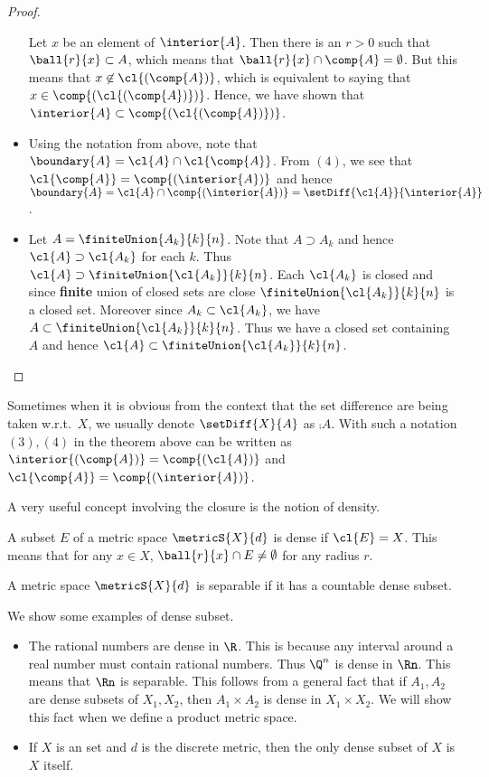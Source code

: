\begin{proof}
\begin{itemize}
	    Let $x$ be an element of $\interior{A}$. Then there is an $r > 0$ such that $\ball{r}{x} \subset
	    A$, which means that $\ball{r}{x} \cap \comp{A} = \emptyset$. But this means that $x \not\in
	    \cl{(\comp{A})}$, which is equivalent to saying that $x \in \comp{(\cl{(\comp{A})})}$. Hence, we
	    have shown that $\interior{A} \subset \comp{(\cl{(\comp{A})})}$.
	\item
	    Using the notation from above, note that $\boundary{A} = \cl{A}\cap\cl{\comp{A}}$. From $(4)$, we
	    see that $\cl{\comp{A}} = \comp{(\interior{A})}$ and hence $\boundary{A} =
	    \cl{A}\cap\comp{(\interior{A})} = \setDiff{\cl{A}}{\interior{A}}$.
	\item
	    Let $A = \finiteUnion{A_k}{k}{n}$. Note that $A \supset A_k$ and hence $\cl{A} \supset \cl{A_k}$ for
	    each $k$. Thus $\cl{A} \supset \finiteUnion{\cl{A_k}}{k}{n}$.
	    Each $\cl{A_k}$ is closed and since \textbf{finite} union of closed sets are close
	    $\finiteUnion{\cl{A_k}}{k}{n}$ is a closed set. Moreover since $A_k \subset \cl{A_k}$, we have $A
	    \subset \finiteUnion{\cl{A_k}}{k}{n}$. Thus we have a closed set containing $A$ and hence $\cl{A}
	    \subset \finiteUnion{\cl{A_k}}{k}{n}$.
    \end{itemize}
\end{proof}
\begin{Remark}
    Sometimes when it is obvious from the context that the set difference are being taken w.r.t.~$X$, we
    usually denote $\setDiff{X}{A}$ as $\comp{A}$. With such a notation $(3),(4)$ in the theorem above can be
    written as \break{}$\interior{(\comp{A})} = \comp{(\cl{A})}$ and $\cl{\comp{A}} = \comp{(\interior{A})}$.
\end{Remark}
A very useful concept involving the closure is the notion of density.
\begin{Definition}[name=Dense subset]
    A subset $E$ of a metric space $\metricS{X}{d}$ is dense if $\cl{E} = X$. This means that for any 
    $x \in X$, $\ball{r}{x}\cap E \neq \emptyset$ for any radius $r$.
\end{Definition}
\begin{Definition}[name=Separable]
    A metric space $\metricS{X}{d}$ is separable if it has a countable dense subset.
\end{Definition}
\begin{Example}
    We show some examples of dense subset.
    \begin{itemize}
	\item
	    The rational numbers are dense in $\R$. This is because any interval around a real number must
	    contain rational numbers. Thus $\Q^n$ is dense in $\Rn$. This means that $\Rn$ is separable.
	    This follows from a general fact that if
	    $A_1,A_2$ are dense subsets of $X_1,X_2$, then $A_1\times A_2$ is dense in $X_1\times X_2$. 
	    We will show this fact when we define a product metric space. 
	    
	\item
	    If $X$ is an set and $d$ is the discrete metric, then the only dense subset of $X$ is $X$ itself.
    \end{itemize}
\end{Example}
